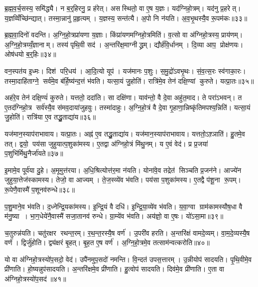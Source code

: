 ब्र॒ह्म॒व॒र्च॒सस्य॒ समि॑द्ध्यै। न ब॒र्॒हिरनु॒ प्र ह॑रेत्। असस्थितो॒ वा ए॒ष य॒ज्ञः। यद॑ग्निहो॒त्रम्। यद॑नु प्र॒हरेत्। य॒ज्ञव्विँच्छि॑न्द्यात्। तस्मा॒न्नानु॑ प्र॒हृत्यम्। य॒ज्ञस्य॒ सन्त॑त्यै। अ॒पो नि न॑यति। अ॒व॒भृ॒थस्यै॒व रू॒पम॑कः॥३३॥\anuvakamend[अ॒भ॒व॒न्भ॒व॒ति॒ जु॒हु॒यान्न॑यति मार्ष्टि॒ द्विः प्राश्ञा॑ति प्राजाप॒त्यमाचा॑मतीन्धेऽकः]

ब्र॒ह्म॒वा॒दिनो॑ वदन्ति। अ॒ग्नि॒हो॒त्रप्रा॑यणा य॒ज्ञाः। किंप्रा॑यणमग्निहो॒त्रमिति॑। व॒त्सो वा अ॑ग्निहो॒त्रस्य॒ प्राय॑णम्। अ॒ग्नि॒हो॒त्रय्यँ॒ज्ञानाम्। तस्य॑ पृथि॒वी सद॑। अ॒न्तरि॑क्ष॒माग्नीद्ध्रम्। द्यौर्\mbox{}ह॑वि॒र्धानम्। दि॒व्या आप॒ प्रोक्ष॑णयः। ओष॑धयो ब॒र्॒हिः॥३४॥

वन॒स्पत॑य इ॒ध्मः। दिश॑ परि॒धय॑। आ॒दि॒त्यो यूप॑। यज॑मानः प॒शुः। स॒मु॒द्रो॑ऽवभृ॒थः। सं॒व॒त्स॒रः स्व॑गाका॒रः। तस्मा॒दाहि॑ताग्ने॒ सर्व॑मे॒व ब॑र्\mbox{}हि॒ष्य॑न्द॒त्तं भ॑वति। यत्सा॒यं जु॒होति॑। रात्रि॑मे॒व तेन॑ दक्षि॒ण्यां कुरुते। यत्प्रा॒तः॥३५॥

अह॑रे॒व तेन॑ दक्षि॒ण्यं॑ कुरुते। यत्ततो॒ ददा॑ति। सा दक्षि॑णा। याव॑न्तो॒ वै दे॒वा अहु॑त॒माद\sn{}। ते परा॑ऽभवन्। त ए॒तद॑ग्निहो॒त्र सर्व॑स्यै॒व स॑मव॒दाया॑जुहवुः। तस्मा॑दाहुः। अ॒ग्नि॒हो॒त्रं वै दे॒वा गृ॒हाणा॒न्निष्कृ॑तिमपश्य॒न्निति॑। यत्सा॒यं जु॒होति॑। रात्रि॑या ए॒व तद्धु॒ताद्या॑य॥३६॥

यज॑मान॒स्याप॑राभावाय। यत्प्रा॒तः। अह्न॑ ए॒व तद्धु॒ताद्या॑य। यज॑मान॒स्याप॑राभावाय। यत्ततो॒ऽश़्ञाति॑। हु॒तमे॒व तत्। द्वयो॒ पय॑सा जुहुयात्प॒शुका॑मस्य। ए॒तद्वा अ॑ग्निहो॒त्रं मि॑थु॒नम्। य ए॒वं वेद॑। प्र प्र॒जया॑ प॒शुभि॑र्मिथु॒नैर्जा॑यते॥३७॥

इ॒मामे॒व पूर्व॑या दु॒हे। अ॒मूमुत्त॑रया। अ॒धि॒श्रित्योत्त॑र॒मा न॑यति। योना॑वे॒व तद्रेत॑ सिञ्चति प्र॒जन॑ने। आज्ये॑न जुहुया॒त्तेज॑स्कामस्य। तेजो॒ वा आज्यम्। ते॒ज॒स्व्ये॑व भ॑वति। पय॑सा प॒शुका॑मस्य। ए॒तद्वै प॑शू॒ना रू॒पम्। रू॒पेणै॒वास्मै॑ प॒शूनव॑रुन्धे॥३८॥

प॒शु॒माने॒व भ॑वति। द॒ध्नेन्द्रि॒यका॑मस्य। इ॒न्द्रि॒यं वै दधि॑। इ॒न्द्रि॒या॒व्ये॑व भ॑वति। य॒वा॒ग्वा ग्राम॑कामस्यौष॒धा वै म॑नु॒ष्या। भा॒ग॒धेये॑नै॒वास्मै॑ सजा॒तानव॑ रुन्धे। ग्रा॒म्ये॑व भ॑वति। अय॑ज्ञो॒ वा ए॒षः। यो॑ऽसा॒मा॥३९॥

च॒तुरुन्न॑यति। चतु॑रक्षर रथन्त॒रम्। र॒थ॒न्त॒रस्यै॒ष वर्ण॑। उ॒परी॑व हरति। अ॒न्तरि॑क्षं वामदे॒व्यम्। वा॒म॒दे॒व्यस्यै॒ष वर्ण॑। द्विर्जु॑होति। द्व्य॑क्षरं बृ॒हत्। बृ॒ह॒त ए॒ष वर्ण॑। अ॒ग्नि॒हो॒त्रमे॒व तत्साम॑न्वत्करोति॥४०॥

यो वा अ॑ग्निहो॒त्रस्यो॑प॒सदो॒ वेद॑। उपै॑नमुप॒सदो॑ नमन्ति। वि॒न्दत॑ उपस॒त्तारम्। उ॒न्नीयोप॑ सादयति। पृ॒थि॒वीमे॒व प्री॑णाति। हो॒ष्यन्नुप॑सादयति। अ॒न्तरि॑क्षमे॒व प्री॑णाति। हु॒त्वोप॑ सादयति। दिव॑मे॒व प्री॑णाति। ए॒ता वा अ॑ग्निहो॒त्रस्यो॑प॒सद॑॥४१॥

